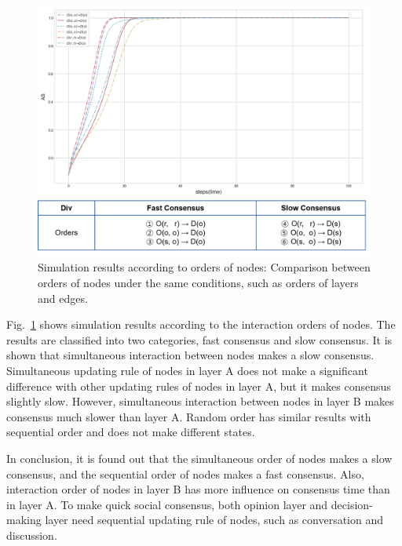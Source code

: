 \begin{figure}[!htb]
	\centering
	\includegraphics[width=\hsize]{figure/chap4_nodeorder.png}
	\caption{Simulation results according to orders of nodes: Comparison between orders of nodes under the same conditions, such as orders of layers and edges.}
	\label{chap4_nodeorder}
\end{figure}

Fig.~\ref{chap4_nodeorder} shows simulation results according to the interaction orders of nodes. The results are classified into two categories, fast consensus and slow consensus. It is shown that simultaneous interaction between nodes makes a slow consensus. Simultaneous updating rule of nodes in layer A does not make a significant difference with other updating rules of nodes in layer A, but it makes consensus slightly slow. However, simultaneous interaction between nodes in layer B makes consensus much slower than layer A. Random order has similar results with sequential order and does not make different states. 

In conclusion, it is found out that the simultaneous order of nodes makes a slow consensus, and the sequential order of nodes makes a fast consensus. Also, interaction order of nodes in layer B has more influence on consensus time than in layer A. To make quick social consensus, both opinion layer and decision-making layer need sequential updating rule of nodes, such as conversation and discussion.\\     

